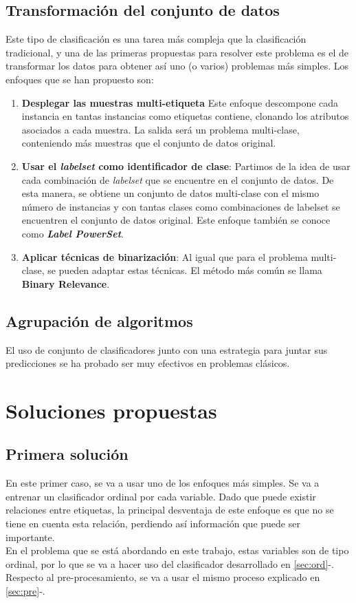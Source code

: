 \subsection{Transformación del conjunto de datos}
Este tipo de clasificación es una tarea más compleja que la clasificación tradicional, y una de las primeras propuestas para resolver este problema es el de transformar los datos para obtener así uno (o varios) problemas más simples.
Los enfoques que se han propuesto son:
\begin{enumerate}
	\item \textbf{Desplegar las muestras multi-etiqueta} Este enfoque descompone cada instancia en tantas instancias como etiquetas contiene, clonando los atributos asociados a cada muestra. La salida será un problema multi-clase, conteniendo más muestras que el conjunto de datos original.
	\item \textbf{Usar el \textit{labelset} como identificador de clase}: Partimos de la idea de usar cada combinación de \textit{labelset} que se encuentre en el conjunto de datos. De esta manera, se obtiene un conjunto de datos multi-clase con el mismo número de instancias y con tantas clases como combinaciones de labelset se encuentren el conjunto de datos original. Este enfoque también se conoce como \textbf{\textit{Label PowerSet}}.
	\item \textbf{Aplicar técnicas de binarización}: Al igual que para el problema multi-clase, se pueden adaptar estas técnicas. El método más común se llama \textbf{Binary Relevance}.
\end{enumerate}
\subsection{Agrupación de algoritmos}
El uso de conjunto de clasificadores junto con una estrategia para juntar sus predicciones se ha probado ser muy efectivos en problemas clásicos.

\section{Soluciones propuestas}
\subsection{Primera solución}
En este primer caso, se va a usar uno de los enfoques más simples. Se va a entrenar un clasificador ordinal por cada variable.
Dado que puede existir relaciones entre etiquetas, la principal desventaja de este enfoque es que no se tiene en cuenta esta relación, perdiendo así información que puede ser importante.\\
\linebreak
En el problema que se está abordando en este trabajo, estas variables son de tipo ordinal, por lo que se va a hacer uso del clasificador desarrollado en \ref{sec:ord}-.
Respecto al pre-procesamiento, se va a usar el mismo proceso explicado en \ref{sec:pre}-.\\

